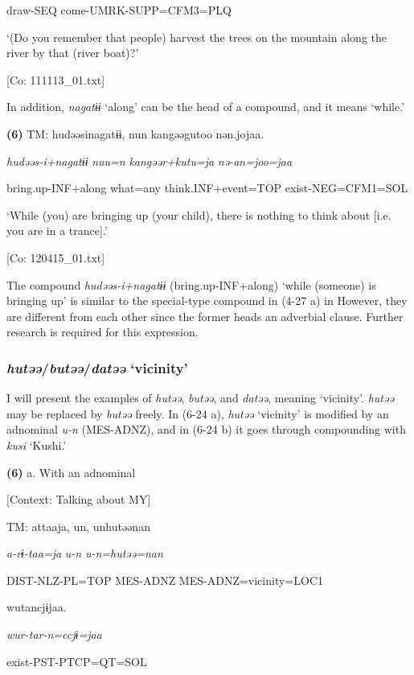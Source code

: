       draw-SEQ  come-UMRK-SUPP=CFM3=PLQ

      ‘(Do you remember that people) harvest the trees on the mountain along the river by that (river boat)?’

      [Co: 111113\_01.txt]

In addition, \textit{nagatɨɨ} ‘along’ can be the head of a compound, and it means ‘while.’

\textbf{(6)}  TM:  hudəəsinagatɨɨ,  nun  kangəəgutoo  nən.jojaa.

    \textit{hudəəs-i+nagatɨɨ}  \textit{nuu=n}  \textit{kangəər+kutu=ja}  \textit{nə-an=joo=jaa}

    bring.up-INF+along  what=any  think.INF+event=TOP  exist-NEG=CFM1=SOL

    ‘While (you) are bringing up (your child), there is nothing to think about [i.e. you are in a trance].’

    [Co: 120415\_01.txt]

The compound \textit{hudəəs-i+nagatɨɨ} (bring.up-INF+along) ‘while (someone) is bringing up’ is similar to the special-type compound in (4-27 a) in  However, they are different from each other since the former heads an adverbial clause. Further research is required for this expression.

\subsubsection{\textit{hutəə}/\textit{butəə}/\textit{datəə} ‘vicinity’}

I will present the examples of \textit{hutəə}, \textit{butəə}, and \textit{datəə}, meaning ‘vicinity’. \textit{hutəə} may be replaced by \textit{butəə} freely. In (6-24 a), \textit{hutəə} ‘vicinity’ is modified by an adnominal \textit{u-n} (MES-ADNZ), and in (6-24 b) it goes through compounding with \textit{kusi} ‘Kushi.’

\textbf{(6)}  a.  With an adnominal

    [Context: Talking about MY]

    TM:  attaaja,  un,  unhutəənan

      \textit{a-rɨ-taa=ja}  \textit{u-n}  \textit{u-n=hutəə=nan}

      DIST-NLZ-PL=TOP  MES-ADNZ  MES-ADNZ=vicinity=LOC1

      wutancjɨjaa.

      \textit{wur-tar-n=ccjɨ=jaa}

      exist-PST-PTCP=QT=SOL

